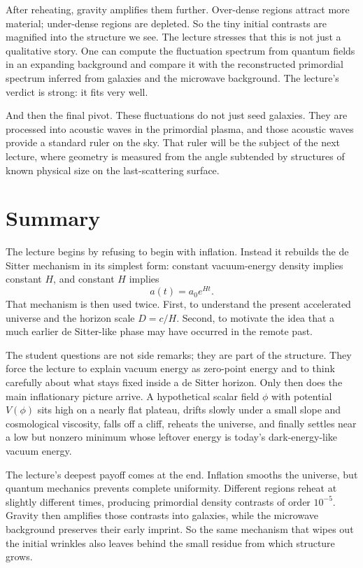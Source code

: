 After reheating, gravity amplifies them further. Over-dense regions attract more material; under-dense regions are depleted. So the tiny initial contrasts are magnified into the structure we see. The lecture stresses that this is not just a qualitative story. One can compute the fluctuation spectrum from quantum fields in an expanding background and compare it with the reconstructed primordial spectrum inferred from galaxies and the microwave background. The lecture's verdict is strong: it fits very well.

And then the final pivot. These fluctuations do not just seed galaxies. They are processed into acoustic waves in the primordial plasma, and those acoustic waves provide a standard ruler on the sky. That ruler will be the subject of the next lecture, where geometry is measured from the angle subtended by structures of known physical size on the last-scattering surface.

\section{Summary}

The lecture begins by refusing to begin with inflation. Instead it rebuilds the de Sitter mechanism in its simplest form: constant vacuum-energy density implies constant \(H\), and constant \(H\) implies
\[
a(t)=a_0 e^{Ht}.
\]
That mechanism is then used twice. First, to understand the present accelerated universe and the horizon scale \(D=c/H\). Second, to motivate the idea that a much earlier de Sitter-like phase may have occurred in the remote past.

The student questions are not side remarks; they are part of the structure. They force the lecture to explain vacuum energy as zero-point energy and to think carefully about what stays fixed inside a de Sitter horizon. Only then does the main inflationary picture arrive. A hypothetical scalar field \(\phi\) with potential \(V(\phi)\) sits high on a nearly flat plateau, drifts slowly under a small slope and cosmological viscosity, falls off a cliff, reheats the universe, and finally settles near a low but nonzero minimum whose leftover energy is today's dark-energy-like vacuum energy.

The lecture's deepest payoff comes at the end. Inflation smooths the universe, but quantum mechanics prevents complete uniformity. Different regions reheat at slightly different times, producing primordial density contrasts of order \(10^{-5}\). Gravity then amplifies those contrasts into galaxies, while the microwave background preserves their early imprint. So the same mechanism that wipes out the initial wrinkles also leaves behind the small residue from which structure grows.